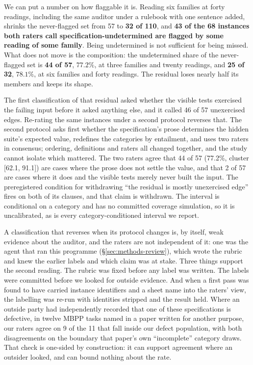 We can put a number on how flaggable it is. Reading six families at forty readings, including the
same auditor under a rulebook with one sentence added, shrinks the never-flagged set from 57 to
\textbf{32 of 110}, and \textbf{43 of the 68 instances both raters call specification-undetermined
are flagged by some reading of some family}. Being undetermined is not sufficient for being
missed. What does not move is the composition: the undetermined share of the never-flagged set is
\textbf{44 of 57}, $77.2\%$, at three families and twenty readings, and \textbf{25 of 32},
$78.1\%$, at six families and forty readings. The residual loses nearly half its members and keeps
its shape.

The first classification of that residual asked whether the visible tests exercised the failing
input before it asked anything else, and it called 46 of 57 unexercised edges. Re-rating the same
instances under a second protocol reverses that. The second protocol asks first whether the
specification's prose determines the hidden suite's expected value, redefines the categories by
entailment, and uses two raters in consensus; ordering, definitions and raters all changed
together, and the study cannot isolate which mattered. The two raters agree that 44 of 57
(77.2\%, cluster [62.1, 91.1]) are cases where the prose does not settle the value, and that 2 of
57 are cases where it does and the visible tests merely never built the input. The preregistered
condition for withdrawing ``the residual is mostly unexercised edge'' fires on both of its
clauses, and that claim is withdrawn. The interval is conditional on a category and has no
committed coverage simulation, so it is uncalibrated, as is every category-conditioned interval we
report.

A classification that reverses when its protocol changes is, by itself, weak evidence about the
auditor, and the raters are not independent of it: one was the agent that ran this programme
(\S\ref{sec:methods-review}), which wrote the rubric and knew the earlier labels and which claim
was at stake. Three things support the second reading. The rubric was fixed before any label was
written. The labels were committed before we looked for outside evidence. And when a first pass
was found to have carried instance identifiers and a sheet name into the raters' view, the
labelling was re-run with identities stripped and the result held. Where an outside party had
independently recorded that one of these specifications is defective, in twelve MBPP tasks named
in a paper written for another purpose, our raters agree on 9 of the 11 that fall inside our
defect population, with both disagreements on the boundary that paper's own ``incomplete''
category draws. That check is one-sided by construction: it can support agreement where an
outsider looked, and can bound nothing about the rate.

